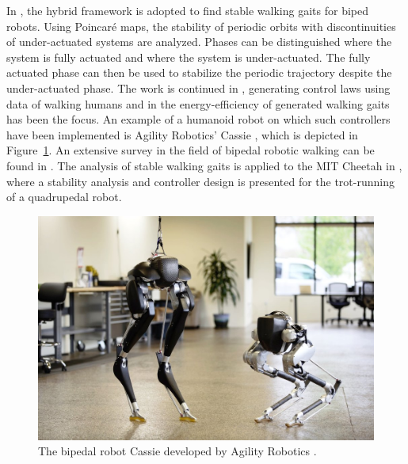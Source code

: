 \documentclass[../DC2017114Bouma.tex]{subfiles}
\begin{document}
In \cite{Grizzle2001,Morris2009}, the hybrid framework is adopted to find stable walking gaits for biped robots. Using Poincar\'{e} maps, the stability of periodic orbits with discontinuities of under-actuated systems are analyzed. Phases can be distinguished where the system is fully actuated and where the system is under-actuated. The fully actuated phase can then be used to stabilize the periodic trajectory despite the under-actuated phase. The work is continued in \cite{Ames2014}, generating control laws using data of walking humans and in \cite{Reher2016} the energy-efficiency of generated walking gaits has been the focus. An example of a humanoid robot on which such controllers have been implemented is Agility Robotics' Cassie \cite{Cassie}, which is depicted in Figure~\ref{fig:cassie}. An extensive survey in the field of bipedal robotic walking can be found in \cite{Grizzle2014}. The analysis of stable walking gaits is applied to the MIT Cheetah in \cite{Hyun2014}, where a stability analysis and controller design is presented for the trot-running of a quadrupedal robot.  

\begin{figure}[b!]
\centering
\includegraphics[width=.6\textwidth]{cassie.jpg}\caption{The bipedal robot Cassie developed by Agility Robotics \cite{Cassie}.}\label{fig:cassie}
\end{figure}
\end{document}
